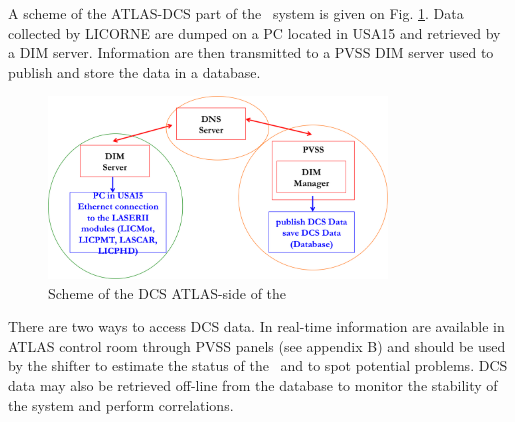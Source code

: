 A scheme of the ATLAS-DCS part of the \las~system is given on Fig. \ref{fig:lasdcs}. Data collected by LICORNE are dumped on a PC located in USA15 and retrieved by a DIM server. Information are then transmitted to a PVSS DIM server used to publish and store the data in a database.

\begin{figure}[htbp]
\centering
\includegraphics[width=9cm]{figures/dcs_scheme.png}
\caption{Scheme of the DCS ATLAS-side of the \las}\label{fig:lasdcs}
\end{figure}

There are two ways to access DCS data. In real-time information are available in ATLAS control room through PVSS panels (see appendix B) and should be used by the shifter to estimate the status of the \laser~and to spot potential problems. DCS data may also be retrieved off-line from the database to monitor the stability of the system and perform correlations.